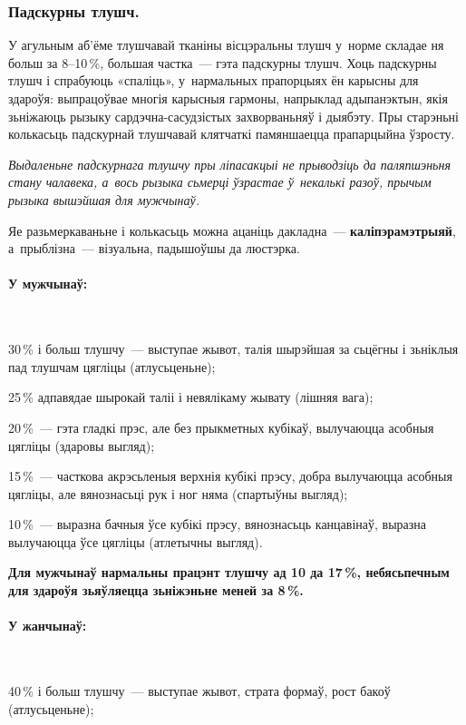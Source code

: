 \subsubsection{Падскурны тлушч.} 
У агульным аб'ёме тлушчавай тканіны вісцэральны тлушч у~норме складае ня больш за 8--10\,\%, большая частка~--- гэта падскурны тлушч. Хоць падскурны тлушч і спрабуюць «спаліць», у~нармальных прапорцыях ён карысны для здароўя: выпрацоўвае многія карысныя гармоны, напрыклад адыпанэктын, якія зьніжаюць рызыку сардэчна-сасудзістых захворваньняў і дыябэту. Пры старэньні колькасьць падскурнай тлушчавай клятчаткі памяншаецца прапарцыйна ўзросту.

\emph{Выдаленьне падскурнага тлушчу пры ліпасакцыі не прыводзіць да паляпшэньня стану чалавека, а~вось рызыка сьмерці ўзрастае ў~некалькі разоў, прычым рызыка вышэйшая для мужчынаў.}

Яе разьмеркаваньне і колькасьць можна ацаніць дакладна~--- \textbf{каліпэрамэтрыяй}, а~прыблізна~--- візуальна, падышоўшы да люстэрка.

\paragraph{У мужчынаў:}~

30\,\% і больш тлушчу~--- выступае жывот, талія шырэйшая за сьцёгны і зьніклыя пад тлушчам цягліцы (атлусьценьне);

25\,\% адпавядае шырокай таліі і невялікаму жывату (лішняя вага);

20\,\%~--- гэта гладкі прэс, але без прыкметных кубікаў, вылучаюцца асобныя цягліцы (здаровы выгляд);

15\,\%~--- часткова акрэсьленыя верхнія кубікі прэсу, добра вылучаюцца асобныя цягліцы, але вянознасьці рук і ног няма (спартыўны выгляд);

10\,\%~--- выразна бачныя ўсе кубікі прэсу, вянознасьць канцавінаў, выразна вылучаюцца ўсе цягліцы (атлетычны выгляд).

\textbf{Для мужчынаў нармальны працэнт тлушчу ад 10 да 17\,\%, небясьпечным для здароўя зьяўляецца зьніжэньне меней за 8\,\%.}

\paragraph{У жанчынаў:}~

40\,\% і больш тлушчу~--- выступае жывот, страта формаў, рост бакоў (атлусьценьне);

